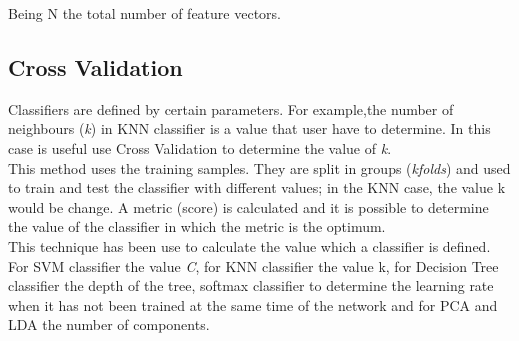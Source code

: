 Being N the total number of feature vectors.\\

\subsection{Cross Validation}
Classifiers are defined by certain parameters. For example,the number of neighbours (\textit{k}) in KNN classifier is a value that user have to determine. In this case is useful use Cross Validation to determine the value of \textit{k}.\\

This method uses the training samples. They are split in groups (\textit{kfolds}) and used to train and test the classifier with different values; in the KNN case, the value k would be change. A metric (score) is calculated and it is possible to determine the value of the classifier in which the metric is the optimum.\\

This technique has been use to calculate the value which a classifier is defined. For SVM classifier the value \textit{C}, for KNN classifier the value {k}, for Decision Tree classifier the depth of the tree, softmax classifier to determine the learning rate when it has not been trained at the same time of the network and for PCA and LDA the number of components. \\
